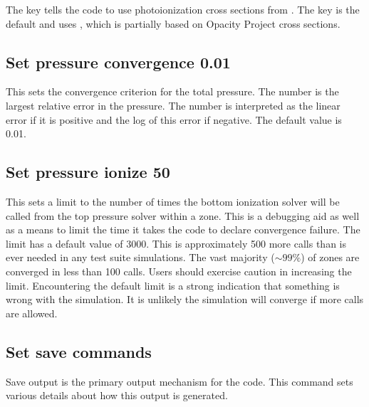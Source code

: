 The key  tells the code to use photoionization
cross sections from \citet{Verner1995}.
The key  is the default and uses
\citet{VernerFerlandKorista1996}, which is partially based
on Opacity Project cross sections.

\subsection{Set pressure convergence 0.01}

This sets the convergence criterion for the total pressure.
The number
is the largest relative error in the pressure.
The number is interpreted
as the linear error if it is positive and the log of this error if negative.
The default value is 0.01.

\subsection{Set pressure ionize 50}

This sets a limit to the number of times the bottom ionization solver
will be called from the top pressure solver within a zone.
This is a debugging aid as well as a means to limit the time it
takes the code to declare convergence failure.
The limit has a default value of 3000.
This is approximately 500 more calls than is ever needed in any test suite simulations.
The vast majority ($\sim99\%$) of zones are converged in less than 100 calls.
Users should exercise caution in increasing the limit.
Encountering the default limit is a strong indication that something
is wrong with the simulation.
It is unlikely the simulation will converge if more calls are allowed.

\subsection{Set save commands}

Save output is the primary output mechanism for the code.
This command sets various details about
how this output is generated.

